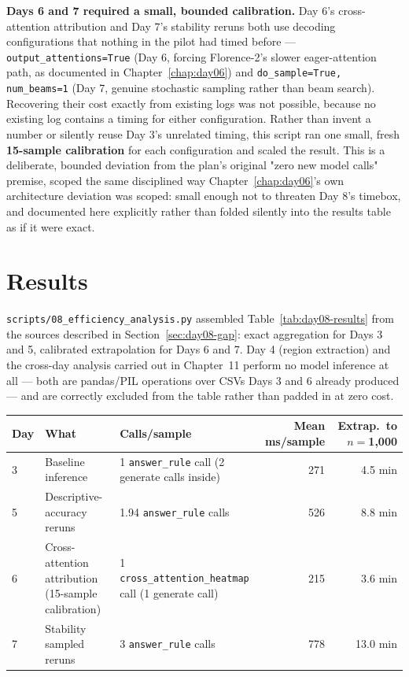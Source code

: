 \textbf{Days 6 and 7 required a small, bounded calibration.} Day 6's cross-attention attribution
and Day 7's stability reruns both use decoding configurations that nothing in the pilot had timed
before --- \texttt{output\_attentions=True} (Day 6, forcing Florence-2's slower eager-attention
path, as documented in Chapter~\ref{chap:day06}) and \texttt{do\_sample=True, num\_beams=1} (Day 7,
genuine stochastic sampling rather than beam search). Recovering their cost exactly from existing
logs was not possible, because no existing log contains a timing for either configuration. Rather
than invent a number or silently reuse Day 3's unrelated timing, this script ran one small, fresh
\textbf{15-sample calibration} for each configuration and scaled the result. This is a deliberate,
bounded deviation from the plan's original "zero new model calls" premise, scoped the same
disciplined way Chapter~\ref{chap:day06}'s own architecture deviation was scoped: small enough not
to threaten Day 8's timebox, and documented here explicitly rather than folded silently into the
results table as if it were exact.

\section{Results}

\texttt{scripts/08\_efficiency\_analysis.py} assembled Table~\ref{tab:day08-results} from the
sources described in Section~\ref{sec:day08-gap}: exact aggregation for Days 3 and 5, calibrated
extrapolation for Days 6 and 7. Day 4 (region extraction) and the cross-day analysis carried out in
Chapter~11 perform no model inference at all --- both are pandas/PIL operations over CSVs Days 3 and
6 already produced --- and are correctly excluded from the table rather than padded in at zero cost.

\begin{center}
\begin{tabular}{p{1.1cm}p{3.6cm}p{4.1cm}rr}
\toprule
\textbf{Day} & \textbf{What} & \textbf{Calls/sample} & \textbf{Mean ms/sample} & \textbf{Extrap.\ to $n=$1,000} \\
\midrule
3 & Baseline inference & 1 \texttt{answer\_rule} call (2 generate calls inside) & 271 & 4.5 min \\
5 & Descriptive-accuracy reruns & 1.94 \texttt{answer\_rule} calls & 526 & 8.8 min \\
6 & Cross-attention attribution (15-sample calibration) & 1 \texttt{cross\_attention\_heatmap} call (1 generate call) & 215 & 3.6 min \\
7 & Stability sampled reruns & 3 \texttt{answer\_rule} calls & 778 & 13.0 min \\
\bottomrule
\end{tabular}
\label{tab:day08-results}
\end{center}

